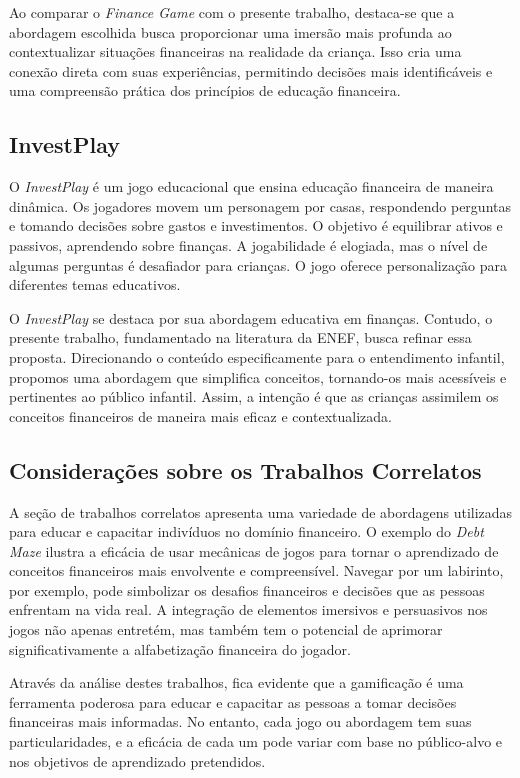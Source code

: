 Ao comparar o \textit{Finance Game}\cite{Finance_Game} com o presente trabalho, destaca-se que a abordagem escolhida busca proporcionar uma imersão mais profunda ao contextualizar situações financeiras na realidade da criança. Isso cria uma conexão direta com suas experiências, permitindo decisões mais identificáveis e uma compreensão prática dos princípios de educação financeira.

\subsection{InvestPlay}
O \textit{InvestPlay}\cite{santos2020investplay} é um jogo educacional que ensina educação financeira de maneira dinâmica. Os jogadores movem um personagem por casas, respondendo perguntas e tomando decisões sobre gastos e investimentos. O objetivo é equilibrar ativos e passivos, aprendendo sobre finanças. A jogabilidade é elogiada, mas o nível de algumas perguntas é desafiador para crianças. O jogo oferece personalização para diferentes temas educativos.

O \textit{InvestPlay}\cite{santos2020investplay} se destaca por sua abordagem educativa em finanças. Contudo, o presente trabalho, fundamentado na literatura da ENEF, busca refinar essa proposta. Direcionando o conteúdo especificamente para o entendimento infantil, propomos uma abordagem que simplifica conceitos, tornando-os mais acessíveis e pertinentes ao público infantil. Assim, a intenção é que as crianças assimilem os conceitos financeiros de maneira mais eficaz e contextualizada.

\subsection{Considerações sobre os Trabalhos Correlatos}

A seção de trabalhos correlatos apresenta uma variedade de abordagens utilizadas para educar e capacitar indivíduos no domínio financeiro. O exemplo do \textit{Debt Maze} ilustra a eficácia de usar mecânicas de jogos para tornar o aprendizado de conceitos financeiros mais envolvente e compreensível. Navegar por um labirinto, por exemplo, pode simbolizar os desafios financeiros e decisões que as pessoas enfrentam na vida real. A integração de elementos imersivos e persuasivos nos jogos não apenas entretém, mas também tem o potencial de aprimorar significativamente a alfabetização financeira do jogador.

Através da análise destes trabalhos, fica evidente que a gamificação é uma ferramenta poderosa para educar e capacitar as pessoas a tomar decisões financeiras mais informadas. No entanto, cada jogo ou abordagem tem suas particularidades, e a eficácia de cada um pode variar com base no público-alvo e nos objetivos de aprendizado pretendidos.

